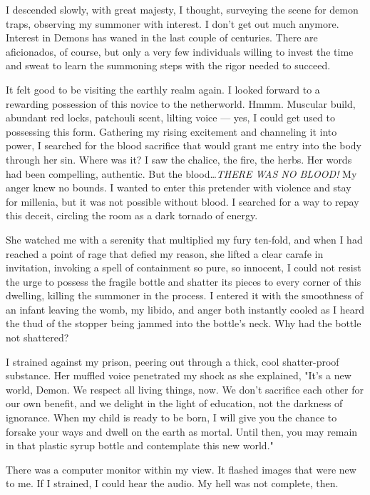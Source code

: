 
I descended slowly, with great majesty, I thought, surveying the scene
for demon traps, observing my summoner with interest. I don't get out
much anymore. Interest in Demons has waned in the last couple of
centuries. There are aficionados, of course, but only a very few
individuals willing to invest the time and sweat to learn the summoning
steps with the rigor needed to succeed.

It felt good to be visiting the earthly realm again. I looked forward to
a rewarding possession of this novice to the netherworld. Hmmm. Muscular
build, abundant red locks, patchouli scent, lilting voice --- yes, I could
get used to possessing this form. Gathering my rising excitement and
channeling it into power, I searched for the blood sacrifice that would
grant me entry into the body through her sin. Where was it? I saw the
chalice, the fire, the herbs. Her words had been compelling, authentic.
But the blood\ldots \emph{THERE WAS NO BLOOD!} My anger knew no bounds. I
wanted to enter this pretender with violence and stay for millenia, but
it was not possible without blood. I searched for a way to repay this
deceit, circling the room as a dark tornado of energy.

She watched me with a serenity that multiplied my fury ten-fold, and
when I had reached a point of rage that defied my reason, she lifted a
clear carafe in invitation, invoking a spell of containment so pure, so
innocent, I could not resist the urge to possess the fragile bottle and
shatter its pieces to every corner of this dwelling, killing the
summoner in the process. I entered it with the smoothness of an infant
leaving the womb, my libido, and anger both instantly cooled as I heard
the thud of the stopper being jammed into the bottle's neck. Why had the
bottle not shattered?

I strained against my prison, peering out through a thick, cool
shatter-proof substance. Her muffled voice penetrated my shock as she
explained, "It's a new world, Demon. We respect all living things, now.
We don't sacrifice each other for our own benefit, and we delight in the
light of education, not the darkness of ignorance. When my child is
ready to be born, I will give you the chance to forsake your ways and
dwell on the earth as mortal. Until then, you may remain in that plastic
syrup bottle and contemplate this new world."

There was a computer monitor within my view. It flashed images that were
new to me. If I strained, I could hear the audio. My hell was not
complete, then.
